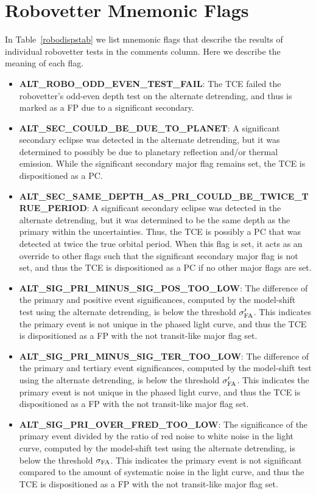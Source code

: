 \section{Robovetter Mnemonic Flags}
\label{minorflagsec}
In Table~\ref{robodispstab} we list mnemonic flags that describe the results of individual robovetter tests in the comments column. Here we describe the meaning of each flag.

\begin{itemize}
\item[] \textbf{ALT\_ROBO\_ODD\_EVEN\_TEST\_FAIL}: The TCE failed the robovetter's odd-even depth test on the alternate detrending, and thus is marked as a FP due to a significant secondary.
\item[] \textbf{ALT\_SEC\_COULD\_BE\_DUE\_TO\_PLANET}: A significant secondary eclipse was detected in the alternate detrending, but it was determined to possibly be due to planetary reflection and/or thermal emission. While the significant secondary major flag remains set, the TCE is dispositioned as a PC.
\item[] \textbf{ALT\_SEC\_SAME\_DEPTH\_AS\_PRI\_COULD\_BE\_TWICE\_TRUE\_PERIOD}: A significant secondary eclipse was detected in the alternate detrending, but it was determined to be the same depth as the primary within the uncertainties. Thus, the TCE is possibly a PC that was detected at twice the true orbital period. When this flag is set, it acts as an override to other flags such that the significant secondary major flag is not set, and thus the TCE is dispositioned as a PC if no other major flags are set.
\item[] \textbf{ALT\_SIG\_PRI\_MINUS\_SIG\_POS\_TOO\_LOW}: The difference of the primary and positive event significances, computed by the model-shift test using the alternate detrending, is below the threshold $\sigma'_{\rm FA}$. This indicates the primary event is not unique in the phased light curve, and thus the TCE is dispositioned as a FP with the not transit-like major flag set.
\item[] \textbf{ALT\_SIG\_PRI\_MINUS\_SIG\_TER\_TOO\_LOW}: The difference of the primary and tertiary event significances, computed by the model-shift test using the alternate detrending, is below the threshold $\sigma'_{\rm FA}$. This indicates the primary event is not unique in the phased light curve, and thus the TCE is dispositioned as a FP with the not transit-like major flag set.
\item[] \textbf{ALT\_SIG\_PRI\_OVER\_FRED\_TOO\_LOW}: The significance of the primary event divided by the ratio of red noise to white noise in the light curve, computed by the model-shift test using the alternate detrending, is below the threshold $\sigma_{\rm FA}$. This indicates the primary event is not significant compared to the amount of systematic noise in the light curve, and thus the TCE is dispositioned as a FP with the not transit-like major flag set.

\end{itemize}
